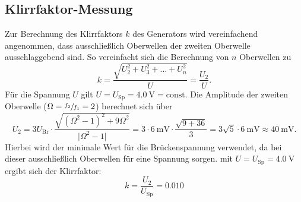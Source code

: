 \subsection{Klirrfaktor-Messung}
Zur Berechnung des Klirrfaktors $k$ des Generators wird vereinfachend angenommen, dass ausschließlich Oberwellen der 
zweiten Oberwelle ausschlaggebend sind. 
So vereinfacht sich die Berechnung von $n$ Oberwellen zu 
\begin{equation}
    k=\frac{\sqrt{U_2^2 + U_3^2 + \dotsc + U_n^2}}{U} = \frac{U_2}{U}.
\end{equation}
Für die Spannung $U$ gilt $U=U_\text{Sp}=\SI{4.0}{\volt}=\text{const}$. 
Die Amplitude der zweiten Oberwelle ($\Omega = \sfrac{f_2}{f_1} = 2$) berechnet sich über
\begin{equation}
    U_2=3 U_\text{Br} \cdot \frac{\sqrt{(\Omega ^2 -1)^2 + 9\Omega ^2}}{\lvert \Omega ^2 -1 \rvert}
        =3 \cdot \SI{6}{\milli\volt} \cdot \frac{\sqrt{9 + 36}}{3}=3 \sqrt{5} \cdot \SI{6}{\milli\volt} \approx \SI{40}{\milli\volt} .
\end{equation}
Hierbei wird der minimale Wert für die Brückenspannung verwendet, da bei dieser ausschließlich Oberwellen für eine Spannung sorgen. 
mit $U=U_\text{Sp}=\SI{4.0}{\volt}$ ergibt sich der Klirrfaktor:
\begin{equation}
    k=\frac{U_2}{U_\text{Sp}}=0.010
\end{equation}

